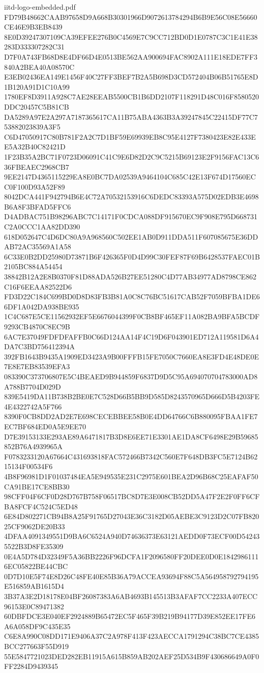 \begin{filecontents*}[overwrite]{iitd-logo-embedded.pdf}
FD79B48662CAAB97658D9A668B30301966D9072613784294B6B9E56C08E56660CE46E9B3EB8439
8E0D39247307109CA39EFEE276B0C4569E7C9CC712BD0D1E0787C3C1E41E38283D333307282C31
D7F0A743FB68D8E4DF66D4E0513BE562AA900694FAC8902A111E18EDE7FF3840A2BEA40A08570C
E3EB02436EA149E1456F40C27FF3BEF7B2A5B698D3CD572404B06B51765E8D1B120A91D1C10A99
1780EF8D3911A928C7AE28EEAB5500CB1B6DD2107F118291D48C016F8580520DDC20457C5B81CB
DA5289A97E2A297A7187365617CA11B75ABA4363B3A39247845C22415DF77C753882023839A3F5
C6D47050917C80B781F2A2C7D1BF59E69939EB8C95E4127F7380423E82E433EE5A32B40C82421D
1F23B35A2BC71F0723D06091C41C9E6D82D2C9C5215B69123E2F9156FAC13C636FBEAEC2968CB7
9EE2147D4365115229EA8E0BC7DA02539A9464104C685C42E13F674D17560ECC0F100D93A52F89
8042DCA441F942794B6E4C72A70532153916C6DEDC83393A575D02EDB3E4698B6A8F3BFAD5FFC6
D4ADBAC751B98296ABC7C14171F0CDCA088DF915670EC9F908E795D668731C2A0CCC1AA82DD390
618D052647C4D6DC80A9A968560C502EE1AB0D911DDA511F607085675E36DDAB72AC35569A1A58
6C33E0B2DD25980D73871B6F426365F0D4D99C30FEF87F69B6428537FAEC01B2105BC884A54454
38842B12A2E8B0370F81D88ADA526B27EE51280C4D77AB34977AD8798CE862C16F6EEAA82522D6
FD3D22C184C699BD0D8D83FB3B81A0C8C76BC51617CAB52F7059BFBA1DE66DF1A042DA938BE935
1C4C687E5CE11562932EF5E6676044399F0CB8BF465EF11A082BA9BFA5BCDF9293CB4870C8EC9B
6AC7E37049FDFDFAFFB0C66D124AA14F4C19D6F043901ED712A119581D6A4DA7C3BD756412394A
392FB1643B9435A1909ED3423A9B00FFFB15FE7050C7660EA8E3FD4E48DE0E7E8E7EB83539EFA3
083390C373706807E5C4BEAED9B944859F6837D9D5C95A694070704783000AD8A788B7704D029D
839E5419DA11B738B2BE0E7C528D66B5BB9D585D8243570965D666D5B4203FE4E4322742A5F766
8390F0CB8DD2AD2E7E698CECEBBEE58B0E4DD64766C6B880095FBAA1FE7EC7BF684ED0A5E9EE70
D7E39153133E293AE89A6471817B3D8E6EE71E3301AE1DA8CF6498E29B59685852B76A4939965A
F0783233120A67664C431693818FAC572466B7342C560E7F648DB3FC5E7124B6215134F00534F6
4B8F96981D1F01037484EA5E949535E231C2975E601BEA2D96B68C25EAFAF50CA91BE17CE8BB30
98CFF04F6CF0D28D767B758F06517BC8D7E3E008CB52DD5A47F2E2F0FF6CFBA8FCF4C524C5ED48
6E84D802271CB94B8A25F91765D27043E36C3182D05AEBE3C9123D2C07FB82025CF9062DE20B33
4DFAA4091349551D9BA6C6524A940D74636373E63121AEDD0F73ECF00D542435522B3D8FE35309
0E4A5D784D32349F5A36BB2226F96DCFA1F2096580FF20DEE0D0E18429861116EC05822BE44CBC
0D7D10E5F74E8D26C48FE40E85B36A79ACCEA93694F88C5A564958792794195E516859AB1615D4
3B37A3E2D18178E04BF26087383A6AB4693B145513B3AFAF7CC2233A407ECC96153E0C89471382
60DBFDCE3E040EF2924889B65472EC5F465F39B219B94177D39E852EE17FE6A6A058DF9C435E35
C6E8A990C08DD171E9406A37C2A978F413F423AECCA1791294C38BC7CE4385BCC277663F55D919
55E5847721023DED282EB11915A615B859AB202AEF25D534B9F430686649A0F0FF2284D9439345

\end{filecontents*}
